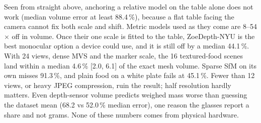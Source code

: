 Seen from straight above, anchoring a relative model on the table alone does
not work (median volume error at least 88.4\,\%), because a flat table facing
the camera cannot fix both scale and shift. Metric models used as they come are
8--54$\times$ off in volume. Once their one scale is fitted to the table,
ZoeDepth-NYU is the best monocular option a device could use, and it is still
off by a median 44.1\,\%. With 24 views, dense MVS and the marker scale, the 16
textured-food scenes land within a median 4.6\,\% [2.0, 6.1] of the exact mesh
volume. Sparse SfM on its own misses 91.3\,\%, and plain food on a white plate
fails at 45.1\,\%. Fewer than 12 views, or heavy JPEG compression, ruin the
result; half resolution hardly matters. Even depth-sensor volume predicts
weighed mass worse than guessing the dataset mean (68.2 vs 52.0\,\% median
error), one reason the glasses report a share and not grams. None of these
numbers comes from physical hardware.
